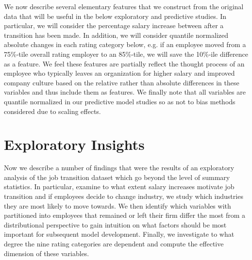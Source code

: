 \documentclass[10pt]{article}
\begin{document}
We now describe several elementary features that we construct from the original data that 
will be useful in the below exploratory and predictive studies.  In particular, we will 
consider the percentage salary increase between after a transition has been made. 
In addition, we will consider quantile normalized absolute changes in each rating 
category below, e.g. if an employee moved from a 75\%-tile overall rating employer 
to an 85\%-tile, we will save the 10\%-ile difference as a feature.  We feel these 
features are partially reflect the thought process of an employee who typically leaves an organization 
for higher salary and improved company culture based on the relative rather than absolute 
differences in these variables and thus include them as features.  We finally note that 
all variables are quantile normalized in our predictive model studies so as not to bias 
methods considered due to scaling effects.

\section{Exploratory Insights} \label{datstu}

Now we describe a number of findings that were the results of an exploratory analysis of 
the job transition dataset which go beyond the level of summary statistics.  In particular, 
examine to what extent salary increases motivate job transition and if employees decide to 
change industry, we study which industries they are most likely to move towards.  We then 
identify which variables with partitioned into employees that remained or left their 
firm differ the most from a distributional perspective to gain intuition on what 
factors should be most important for subsequent model development.  Finally, 
we investigate to what degree the nine rating categories are dependent and 
compute the effective dimension of these variables.
\end{document}
